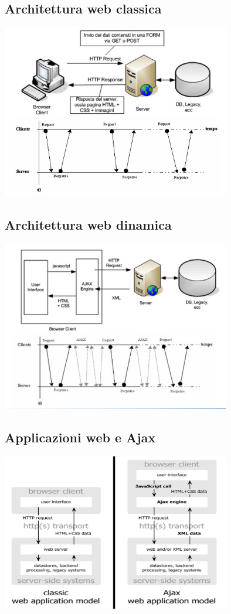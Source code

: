 \documentclass[12pt, a4paper, openany, twoside]{book}
\begin{document}
\subsection{Architettura web classica}
\begin{center}
\includegraphics[width=0.75\textwidth]{25}
\end{center}
\subsection{Architettura web dinamica}
\begin{center}
\includegraphics[width=0.75\textwidth]{26}
\end{center}
\subsection{Applicazioni web e Ajax}
\begin{center}
\includegraphics[width=0.75\textwidth]{27}
\end{center}
\end{document}
